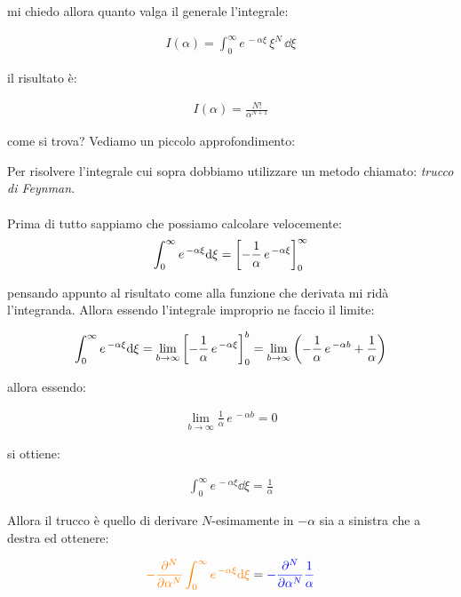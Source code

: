 	mi chiedo allora quanto valga il generale l'integrale:
	
\begin{align*}
	I(\alpha) = \int_0^{ \infty} e^{\, -\alpha \xi} \, \xi^N \, \dd \xi
\end{align*}

	il risultato è:
	
\begin{align*}
	I(\alpha) = \frac{N!}{\alpha^{N+1}}
\end{align*}

	come si trova? Vediamo un piccolo approfondimento:
	
\begin{myapprf}
	Per risolvere l'integrale cui sopra dobbiamo utilizzare un metodo chiamato: \textit{trucco di Feynman}.
	\\
	\\
	Prima di tutto sappiamo che possiamo calcolare velocemente:
\begin{align*}
	\int_0^{\infty} e^{\, -\alpha \xi} \dd \xi = \qty[-\frac{1}{\alpha} \, e^{\, -\alpha \xi}]^{\infty}_0
\end{align*}

	pensando appunto al risultato come alla funzione che derivata mi ridà l'integranda. Allora essendo l'integrale improprio ne faccio il limite:

\begin{align*}
	\int_0^{\infty} e^{\, -\alpha \xi} \dd \xi = \lim_{b \to \infty}\qty[-\frac{1}{\alpha} \, e^{\, -\alpha \xi}]^{b}_0 = \lim_{b\to \infty}\qty(-\frac{1}{\alpha} \, e^{\, -\alpha  b} + \frac{1}{\alpha})
\end{align*}

	allora essendo:
	
\begin{align*}
	\lim_{b\to \infty} \frac{1}{\alpha} \, e^{\, -\alpha  b} = 0
\end{align*}

	si ottiene:
	
\begin{align*}
	\int_0^{\infty} e^{\, -\alpha \xi} \dd \xi =\frac{1}{\alpha}
\end{align*}
	
	Allora il trucco è quello di derivare $N$-esimamente in $-\alpha$ sia a sinistra che a destra ed ottenere:
	
\begin{align*}
	\textcolor{orange}{- \pdv[N]{\alpha} \int_0^{\infty} e^{\, -\alpha \xi} \dd \xi} = \textcolor{blue}{ - \pdv[N]{\alpha}  \frac{1}{\alpha}}
\end{align*}


\end{myapprf}
